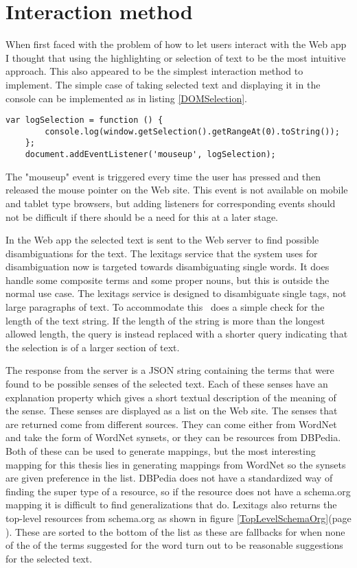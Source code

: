 \section{Interaction method}
\label{Interaction}
When first faced with the problem of how to let users interact with the Web app I thought that using the highlighting or
selection of text to be the most intuitive approach.
This also appeared to be the simplest interaction method to implement.
The simple case of taking selected text and displaying it in the console can be implemented as in listing \ref{DOMSelection}.

\begin{lstlisting}[caption={Logging selected text}, label=DOMSelection]
	var logSelection = function () {
		console.log(window.getSelection().getRangeAt(0).toString());
	};
	document.addEventListener('mouseup', logSelection);
\end{lstlisting}

The "mouseup" event is triggered every time the user has pressed and then released the mouse pointer on the Web site.
This event is not available on mobile and tablet type browsers,
but adding listeners for corresponding events should not be difficult if there should be a need for this at a later stage.

In the Web app the selected text is sent to the Web server to find possible disambiguations for the text.
The lexitags service that the system uses for disambiguation now is targeted towards disambiguating single words.
It does handle some composite terms and some proper nouns, but this is outside the normal use case.
The lexitags service is designed to disambiguate single tags, not large paragraphs of text.
To accommodate this \theartefact\ does a simple check for the length of the text string.
If the length of the string is more than the longest allowed length,
the query is instead replaced with a shorter query indicating that the selection is of a larger section of text.

The response from the server is a JSON string containing the terms that were found to be possible senses of the selected text.
Each of these senses have an explanation property which gives a short textual description of the meaning of the sense.
These senses are displayed as a list on the Web site.
The senses that are returned come from different sources.
They can come either from WordNet and take the form of WordNet synsets, or they can be resources from DBPedia.
Both of these can be used to generate mappings,
but the most interesting mapping for this thesis lies in generating mappings from WordNet so the synsets are given preference in the list.
DBPedia does not have a standardized way of finding the super type of a resource,
so if the resource does not have a schema.org mapping it is difficult to find generalizations that do.
Lexitags also returns the top-level resources from schema.org as shown in figure \ref{TopLevelSchemaOrg}(page \pageref{TopLevelSchemaOrg}).
These are sorted to the bottom of the list as these are fallbacks for when none of the of the terms suggested for
the word turn out to be reasonable suggestions for the selected text.

